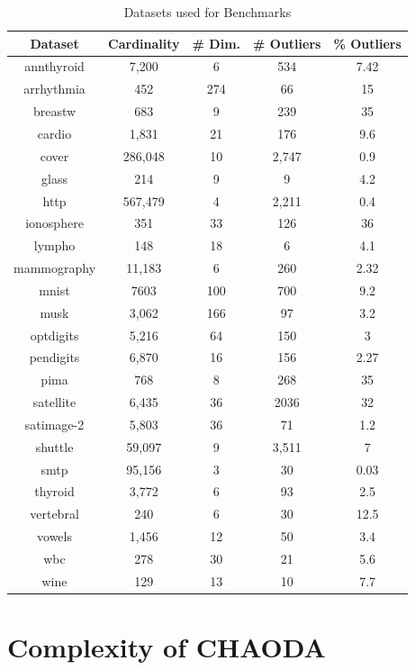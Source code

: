 \begin{table}[!t]
\renewcommand{\arraystretch}{1.25}
\caption{Datasets used for Benchmarks}
\label{supplement:table:datasets}
\centering
\begin{tabular}{|c|c|c|c|c|}
\hline
\textbf{Dataset} & \textbf{Cardinality} & \textbf{\# Dim.} & \textbf{\# Outliers} & \textbf{\% Outliers} \\
\hline
annthyroid & 7,200 & 6 & 534 & 7.42 \\
\hline
arrhythmia & 452 & 274 & 66 & 15 \\
\hline
breastw & 683 & 9 & 239 & 35 \\
\hline
cardio & 1,831 & 21 & 176 & 9.6 \\
\hline
cover & 286,048 & 10 & 2,747 & 0.9 \\
\hline
glass & 214 & 9 & 9 & 4.2 \\
\hline
http & 567,479 & 4 & 2,211 & 0.4 \\
\hline
ionosphere & 351 & 33 & 126 & 36 \\
\hline
lympho & 148 & 18 & 6 & 4.1 \\
\hline
mammography & 11,183 & 6 & 260 & 2.32 \\
\hline
mnist & 7603 & 100 & 700 & 9.2 \\
\hline
musk & 3,062 & 166 & 97 & 3.2 \\
\hline
optdigits & 5,216 & 64 & 150 & 3 \\
\hline
pendigits & 6,870 & 16 & 156 & 2.27 \\
\hline
pima & 768 & 8 & 268 & 35 \\
\hline
satellite & 6,435 & 36 & 2036 & 32 \\
\hline
satimage-2 & 5,803 & 36 & 71 & 1.2 \\
\hline
shuttle & 59,097 & 9 & 3,511 & 7 \\
\hline
smtp & 95,156 & 3 & 30 & 0.03 \\
\hline
thyroid & 3,772 & 6 & 93 & 2.5 \\
\hline
vertebral & 240 & 6 & 30 & 12.5 \\
\hline
vowels & 1,456 & 12 & 50 & 3.4 \\
\hline
wbc & 278 & 30 & 21 & 5.6 \\
\hline
wine & 129 & 13 & 10 & 7.7 \\
\hline
\end{tabular}
\end{table}


\section{Complexity of CHAODA}
\label{supplement:sec:complexity-chaoda}

